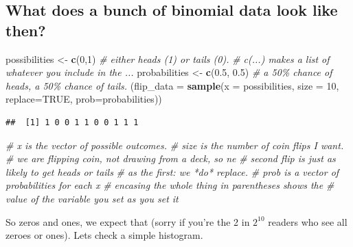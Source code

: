 \documentclass[
]{book}
\newenvironment{Shaded}{\begin{snugshade}}{\end{snugshade}}
\newcommand{\CommentTok}[1]{\textcolor[rgb]{0.56,0.35,0.01}{\textit{#1}}}
\newcommand{\DataTypeTok}[1]{\textcolor[rgb]{0.13,0.29,0.53}{#1}}
\newcommand{\DecValTok}[1]{\textcolor[rgb]{0.00,0.00,0.81}{#1}}
\newcommand{\FloatTok}[1]{\textcolor[rgb]{0.00,0.00,0.81}{#1}}
\newcommand{\KeywordTok}[1]{\textcolor[rgb]{0.13,0.29,0.53}{\textbf{#1}}}
\newcommand{\NormalTok}[1]{#1}
\newcommand{\OtherTok}[1]{\textcolor[rgb]{0.56,0.35,0.01}{#1}}
\newcommand{\StringTok}[1]{\textcolor[rgb]{0.31,0.60,0.02}{#1}}
\begin{document}
\hypertarget{what-does-a-bunch-of-binomial-data-look-like-then}{%
\subsection{What does a bunch of binomial data look like then?}\label{what-does-a-bunch-of-binomial-data-look-like-then}}

\begin{Shaded}
\begin{Highlighting}[]
\NormalTok{possibilities \textless{}{-}}\StringTok{ }\KeywordTok{c}\NormalTok{(}\DecValTok{0}\NormalTok{,}\DecValTok{1}\NormalTok{) }\CommentTok{\# either heads (1) or tails (0).}
                        \CommentTok{\# c(...) makes a list of whatever you include in the ...}
\NormalTok{probabilities \textless{}{-}}\StringTok{ }\KeywordTok{c}\NormalTok{(}\FloatTok{0.5}\NormalTok{, }\FloatTok{0.5}\NormalTok{)}
                        \CommentTok{\# a 50\% chance of heads, a 50\% chance of tails.}
\NormalTok{(}\DataTypeTok{flip\_data =} \KeywordTok{sample}\NormalTok{(}\DataTypeTok{x =}\NormalTok{ possibilities, }\DataTypeTok{size =} \DecValTok{10}\NormalTok{, }\DataTypeTok{replace=}\OtherTok{TRUE}\NormalTok{, }\DataTypeTok{prob=}\NormalTok{probabilities))}
\end{Highlighting}
\end{Shaded}

\begin{verbatim}
##  [1] 1 0 0 1 1 0 0 1 1 1
\end{verbatim}

\begin{Shaded}
\begin{Highlighting}[]
                        \CommentTok{\# x is the vector of possible outcomes.}
                        \CommentTok{\# size is the number of coin flips I want.}
                        \CommentTok{\# we are flipping coin, not drawing from a deck, so ne}
                        \CommentTok{\#   second flip is just as likely to get heads or tails}
                        \CommentTok{\#   as the first: we *do* replace.}
                        \CommentTok{\# prob is a vector of probabilities for each x}
                        \CommentTok{\# encasing the whole thing in parentheses shows the}
                        \CommentTok{\#   value of the variable you set as you set it}
\end{Highlighting}
\end{Shaded}

So zeros and ones, we expect that (sorry if you're the 2 in \(2^{10}\) readers who see all zeroes or ones). Lets check a simple histogram.
\end{document}
